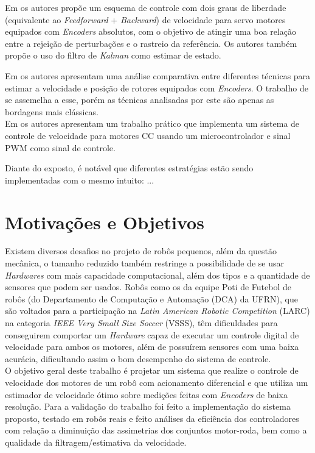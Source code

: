 Em \cite{TOF:PIControl} os autores propõe um esquema de controle com dois graus de liberdade (equivalente ao \emph{Feedforward} + \emph{Backward}) de velocidade para servo motores equipados com \emph{Encoders} absolutos, com o objetivo de atingir uma boa relação entre a rejeição de perturbações e o rastreio da referência. Os autores também propõe o uso do filtro de \emph{Kalman} como estimar de estado.

Em \cite{analise_incr_enc} os autores apresentam uma análise comparativa entre diferentes técnicas para estimar a velocidade e posição de rotores equipados com \emph{Encoders}. O trabalho de \cite{quantization_error01} se assemelha a esse, porém as técnicas analisadas por este são apenas as bordagens mais clássicas.\\

Em \cite{pwm_control} os autores apresentam um trabalho prático que implementa um sistema de controle de velocidade para motores CC usando um microcontrolador e sinal PWM como sinal de controle.


Diante do exposto, é notável que diferentes estratégias estão sendo implementadas com o mesmo intuito: ...

\section{Motivações e Objetivos}
Existem diversos desafios no projeto de robôs pequenos, além da questão mecânica, o tamanho reduzido também restringe a possibilidade de se usar \emph{Hardwares} com mais capacidade computacional, além dos tipos e a quantidade de sensores que podem ser usados. Robôs como os da equipe Poti de Futebol de robôs (do Departamento de Computação e Automação (DCA) da UFRN), que são voltados para a participação na \emph{Latin American Robotic Competition} (LARC) na categoria \emph{IEEE Very Small Size Soccer} (VSSS), têm dificuldades para conseguirem comportar um \emph{Hardware} capaz de executar um controle digital de velocidade para ambos os motores, além de possuírem sensores com uma baixa acurácia, dificultando assim o bom desempenho do sistema de controle.\\

O objetivo geral deste trabalho é projetar um sistema que realize o controle de velocidade dos motores de um robô com acionamento diferencial e que utiliza um estimador de velocidade ótimo sobre medições feitas com \emph{Encoders} de baixa resolução. Para a validação do trabalho foi feito a implementação do sistema proposto, testado em robôs reais e feito análises da eficiência dos controladores com relação a diminuição das assimetrias dos conjuntos motor-roda, bem como a qualidade da filtragem/estimativa da velocidade. %

